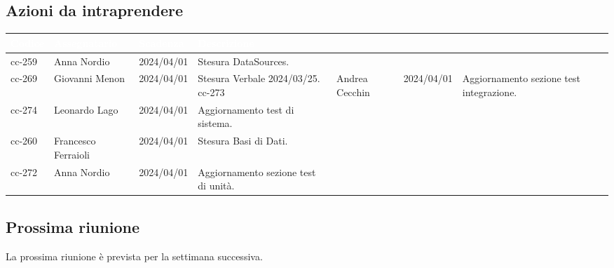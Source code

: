 \subsection{Azioni da intraprendere}
{
    \setlength{\tabcolsep}{10pt}
            \renewcommand{\arraystretch}{1.5}
            \begin{tabularx}{\textwidth}{| l | l | l | X |}
                 \hline
                 \textbf{\textcolor{white}{Codice }} & \textbf{\textcolor{white}{Assegnatario}} & \textbf{\textcolor{white}{Scadenza}} & \textbf{\textcolor{white}{Descrizione}} \\
                 \hline
                 cc-259 & Anna Nordio & 2024/04/01 & Stesura DataSources. \\
                 \hline
                 cc-269 & Giovanni Menon & 2024/04/01 & Stesura Verbale 2024/03/25.
                 \hline
                 cc-273 & Andrea Cecchin & 2024/04/01 & Aggiornamento sezione test integrazione. \\
                 \hline
                 cc-274 & Leonardo Lago & 2024/04/01 & Aggiornamento test di sistema. \\
                \hline
                 cc-260 & Francesco Ferraioli & 2024/04/01 & Stesura Basi di Dati. \\
                 \hline
                  cc-272 & Anna Nordio & 2024/04/01 & Aggiornamento sezione test di unità. \\
                 \hline
            \end{tabularx}
}


\subsection{Prossima riunione} \label{subsec:riunione}
La prossima riunione è prevista per la settimana successiva.
